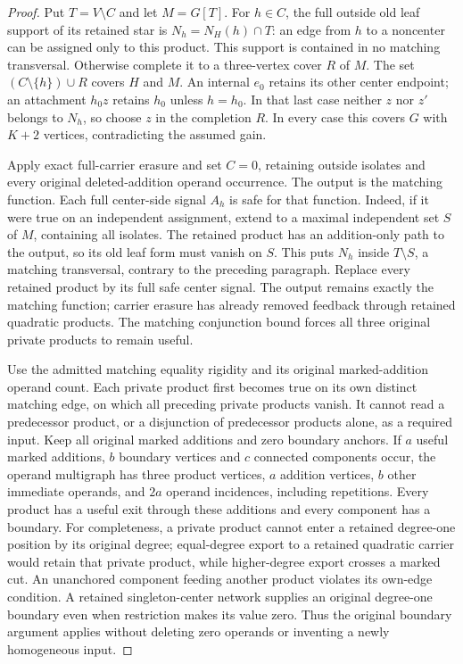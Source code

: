 \documentclass[11pt]{article}
\theoremstyle{definition}
\theoremstyle{remark}
\begin{document}
\begin{proof}
Put $T=V\setminus C$ and let $M=G[T]$. For $h\in C$, the full outside old leaf support of its retained star is $N_h=N_H(h)\cap T$: an edge from $h$ to a noncenter can be assigned only to this product. This support is contained in no matching transversal. Otherwise complete it to a three-vertex cover $R$ of $M$. The set $(C\setminus\{h\})\cup R$ covers $H$ and $M$. An internal $e_0$ retains its other center endpoint; an attachment $h_0z$ retains $h_0$ unless $h=h_0$. In that last case neither $z$ nor $z'$ belongs to $N_h$, so choose $z$ in the completion $R$. In every case this covers $G$ with $K+2$ vertices, contradicting the assumed gain.

Apply exact full-carrier erasure and set $C=0$, retaining outside isolates and every original deleted-addition operand occurrence. The output is the matching function. Each full center-side signal $A_h$ is safe for that function. Indeed, if it were true on an independent assignment, extend to a maximal independent set $S$ of $M$, containing all isolates. The retained product has an addition-only path to the output, so its old leaf form must vanish on $S$. This puts $N_h$ inside $T\setminus S$, a matching transversal, contrary to the preceding paragraph. Replace every retained product by its full safe center signal. The output remains exactly the matching function; carrier erasure has already removed feedback through retained quadratic products. The matching conjunction bound forces all three original private products to remain useful.

Use the admitted matching equality rigidity and its original marked-addition operand count. Each private product first becomes true on its own distinct matching edge, on which all preceding private products vanish. It cannot read a predecessor product, or a disjunction of predecessor products alone, as a required input. Keep all original marked additions and zero boundary anchors. If $a$ useful marked additions, $b$ boundary vertices and $c$ connected components occur, the operand multigraph has three product vertices, $a$ addition vertices, $b$ other immediate operands, and $2a$ operand incidences, including repetitions. Every product has a useful exit through these additions and every component has a boundary. For completeness, a private product cannot enter a retained degree-one position by its original degree; equal-degree export to a retained quadratic carrier would retain that private product, while higher-degree export crosses a marked cut. An unanchored component feeding another product violates its own-edge condition. A retained singleton-center network supplies an original degree-one boundary even when restriction makes its value zero. Thus the original boundary argument applies without deleting zero operands or inventing a newly homogeneous input.


\end{proof}
\end{document}

